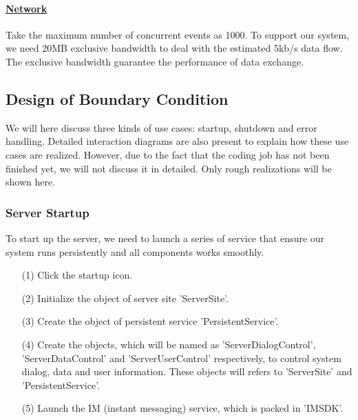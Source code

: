 \documentclass[10pt]{article}
\begin{document}
\paragraph{\underline{Network}} Take the maximum number of concurrent events as 1000. To support our system, we need 20MB exclusive bandwidth to deal with the estimated 5kb/s data flow. The exclusive bandwidth guarantee the performance of data exchange.

\subsection{Design of Boundary Condition}
We will here discuss three kinds of use cases: startup, shutdown and error handling. Detailed interaction diagrams are also present to explain how these use cases are realized. However, due to the fact that the coding job has not been finished yet, we will not discuss it in detailed. Only rough realizations will be shown here.

\subsubsection{Server Startup}
To start up the server, we need to launch a series of service that ensure our system runs persistently and all components works smoothly.

\begin{itemize}
  \item[(1)] Click the startup icon.
  \item[(2)] Initialize the object of server site 'ServerSite'.
  \item[(3)] Create the object of persistent service 'PersistentService'.
  \item[(4)] Create the objects, which will be named as 'ServerDialogControl',  'ServerDataControl' and 'ServerUserControl' respectively, to control system dialog, data and user information. These objects will refers to 'ServerSite' and 'PersistentService'.
  \item[(5)] Launch the IM (instant messaging) service, which is packed in 'IMSDK'.
\end{itemize}
\end{document}
